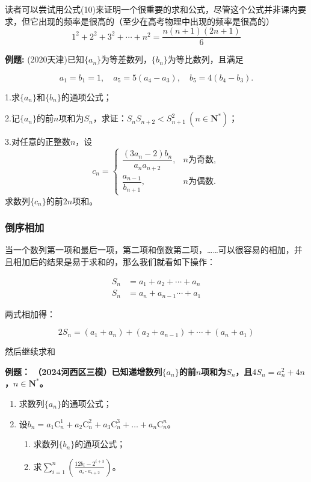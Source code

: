 \documentclass{article}
\begin{document}
\begin{tcolorbox}[colback=blue!10,colframe=blue!70!black,title=]
    读者可以尝试用公式(10)来证明一个很重要的求和公式，尽管这个公式并非课内要求，但它出现的频率是很高的（至少在高考物理中出现的频率是很高的）
    $$1^2+2^2+3^2+\cdots+n^2=\frac{n(n+1)(2n+1)}{6}$$
\end{tcolorbox}

\noindent\textbf{例题: }(2020天津)已知$\{a_n\}$为等差数列，$\{b_n\}$为等比数列，且满足

\[
a_1 = b_1 = 1,\quad a_5 = 5(a_4 - a_3),\quad b_5 = 4(b_4 - b_3).
\]

\noindent 1.求$\{a_n\}$和$\{b_n\}$的通项公式；

\noindent 2.记$\{a_n\}$的前$n$项和为$S_n$，求证：$S_n S_{n+2} < S_{n+1}^2\ (n\in\mathbf{N}^*)$；

\noindent 3.对任意的正整数$n$，设
\[
c_n =
\begin{cases}
\dfrac{(3a_n - 2)b_n}{a_n a_{n+2}}, & n\text{为奇数}, \\[6pt]
\dfrac{a_{n-1}}{b_{n+1}}, & n\text{为偶数}.
\end{cases}
\]
求数列$\{c_n\}$的前$2n$项和。
\newpage

\subsubsection{倒序相加}

当一个数列第一项和最后一项，第二项和倒数第二项，……可以很容易的相加，并且相加后的结果是易于求和的，那么我们就看如下操作：

\begin{align*}
    S_n&=a_1+a_2+\cdots +a_n\\
    S_n&=a_n+a_{n-1}\cdots +a_1
\end{align*}

两式相加得：

$$2S_n=(a_1+a_n)+(a_2+a_{n-1})+\cdots+(a_n+a_1)$$

然后继续求和
\vspace{1\baselineskip}

\noindent\textbf{例题： （2024河西区三模）已知递增数列$\{a_n\}$的前$n$项和为$S_n$，且$4S_n = a_n^2 + 4n$，$n\in\mathbf{N}^*$。}

\begin{enumerate}[label=(\Roman*)] %
    \item 求数列$\{a_n\}$的通项公式；
    
    \item 设$b_n = a_1 \mathrm{C}_n^1 + a_2 \mathrm{C}_n^2 + a_3 \mathrm{C}_n^3 + \dots + a_n \mathrm{C}_n^n$。
    \begin{enumerate}[label=(\roman*)] %
        \item 求数列$\{b_n\}$的通项公式；
        \item 求$\displaystyle\sum_{i=1}^n \left( \frac{12b_i - 2^{i+3}}{a_i \cdot a_{i+2}} \right)$。
    \end{enumerate}
\end{enumerate}
\newpage
\end{document}
